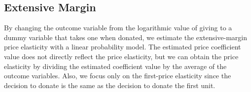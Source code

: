 \documentclass[
  11pt,
  a4paper,
]{article}
\begin{document}
\hypertarget{extensive-margin}{%
\subsection{Extensive Margin}\label{extensive-margin}}

By changing the outcome variable
from the logarithmic value of giving
to a dummy variable that takes one when donated,
we estimate the extensive-margin price elasticity
with a linear probability model.
The estimated price coefficient value
does not directly reflect the price elasticity,
but we can obtain the price elasticity
by dividing the estimated coefficient value
by the average of the outcome variables.
Also, we focus only on the first-price elasticity
since the decision to donate is the same as
the decision to donate the first unit.
\end{document}
